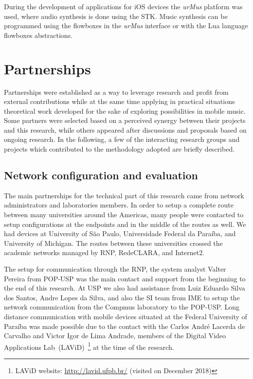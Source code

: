 During the development of applications for iOS devices the \textit{urMus} platform was used, where audio synthesis is done using the STK.
Music synthesis can be programmed using the flowboxes in the \textit{urMus} interface or with the Lua language flowboxes abstractions.


\section{Partnerships}
\label{sec:partnerships}
Partnerships were established as a way to leverage research and profit from external contributions while at the same time applying in practical situations theoretical work developed for the sake of exploring possibilities in mobile music.
Some partners were selected based on a perceived synergy between their projects and this research, while others appeared after discussions and proposals based on ongoing research. In the following, a few of the interacting research groups and projects which contributed to the methodology adopted are briefly described.


\subsection*{Network configuration and evaluation}

The main partnerships for the technical part of this research came from network administrators and laboratories members.
In order to setup a complete route between many universities around the Americas, many people were contacted to setup configurations at the endpoints and in the middle of the routes as well.
We had devices at University of São Paulo, Universidade Federal da Paraíba, and University of Michigan.
The routes between these universities crossed the academic networks managed by RNP, RedeCLARA, and Internet2.

The setup for communication through the RNP, the system analyst Valter Pereira from POP-USP was the main contact and support from the beginning to the end of this research.
At USP we also had assistance from Luiz Eduardo Silva dos Santos, Andre Lopes da Silva, and also the SI team from IME to setup the network communication from the Compmus laboratory to the POP-USP.
Long distance communication with mobile devices situated at the Federal University of Paraíba was made possible due to the contact with the Carlos André Lacerda de Carvalho and Victor Igor de Lima Andrade, members of the Digital Video Applications Lab~(LAViD)~\footnote{LAViD website: \url{http://lavid.ufpb.br/} (visited on December 2018)} at the time of the research.

